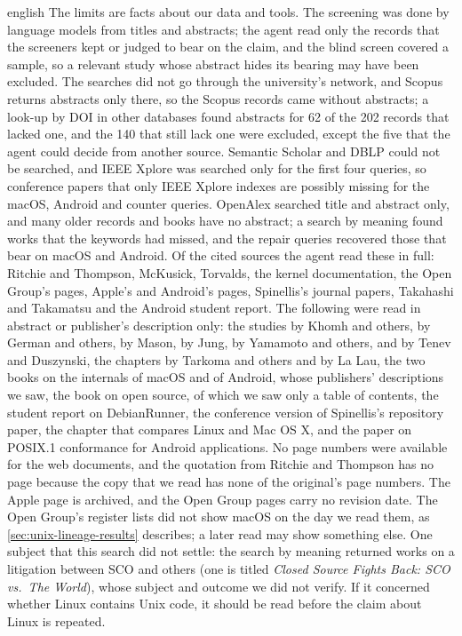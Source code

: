\begin{onlyin}{english}
The limits are facts about our data and tools.
The screening was done by language models from titles and abstracts;
the agent read only the records that the screeners kept or judged to
bear on the claim, and the blind screen covered a sample, so a relevant
study whose abstract hides its bearing may have been excluded.
The searches did not go through the university's network, and Scopus
returns abstracts only there, so the Scopus records came without
abstracts; a look-up by DOI in other databases found abstracts for 62
of the 202 records that lacked one, and the 140 that still lack one were
excluded, except the five that the agent could decide from another
source.
Semantic Scholar and DBLP could not be searched, and IEEE Xplore was
searched only for the first four queries, so conference papers that only
IEEE Xplore indexes are possibly missing for the macOS, Android and
counter queries.
OpenAlex searched title and abstract only, and many older records and
books have no abstract; a search by meaning found works that the keywords
had missed, and the repair queries recovered those that bear on macOS and
Android.
Of the cited sources the agent read these in full: Ritchie and
Thompson,
McKusick, Torvalds, the kernel documentation, the Open Group's pages,
Apple's and Android's pages, Spinellis's journal papers, Takahashi and
Takamatsu and the Android student report.
The following were read in abstract or publisher's description only: the
studies by Khomh and others, by German and others, by Mason, by Jung, by
Yamamoto and others, and by Tenev and Duszynski, the chapters by Tarkoma
and others and by La Lau, the two books on the internals of macOS and of
Android, whose publishers' descriptions we saw, the book on open source,
of which we saw only a table of contents, the student report on
DebianRunner, the conference version of Spinellis's repository paper,
the chapter that compares Linux and Mac OS X, and the paper on POSIX.1
conformance for Android applications.
No page numbers were available for the web documents, and the quotation
from Ritchie and Thompson has no page because the copy that we read has
none of the original's page numbers.
The Apple page is archived, and the Open Group pages carry no revision
date.
The Open Group's register lists did not show macOS on the day we read
them, as \cref{sec:unix-lineage-results} describes; a later read may
show something else.
One subject that this search did not settle: the search by meaning
returned works on a litigation between SCO and others (one is titled
\emph{Closed Source Fights Back: SCO vs.\ The World}), whose subject and
outcome we did not verify.
If it concerned whether Linux contains Unix code, it should be read
before the claim about Linux is repeated.
\end{onlyin}
